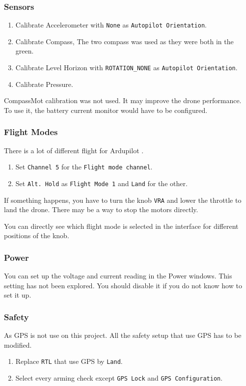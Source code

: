 \subsubsection{Sensors}
\begin{enumerate}
    \item Calibrate Accelerometer with \texttt{None} as \texttt{Autopilot Orientation}.
    \item Calibrate Compass, The two compass was used as they were both in the green.
    \item Calibrate Level Horizon  with \texttt{ROTATION\_NONE} as \texttt{Autopilot Orientation}.
    \item Calibrate Pressure.
\end{enumerate}
CompassMot calibration was not used. It may improve the drone performance. To use it, the battery current monitor would have to be configured.

\subsubsection{Flight Modes}
There is a lot of different flight for Ardupilot \cite{ardupilot_flight_modes}.
\begin{enumerate}
    \item Set \texttt{Channel 5} for the \texttt{Flight mode channel}.
    \item Set \texttt{Alt. Hold} as \texttt{Flight Mode 1} and \texttt{Land} for the other.
\end{enumerate}
If something happens, you have to turn the knob \texttt{VRA} and lower the throttle to land the drone.
There may be a way to stop the motors directly.

You can directly see which flight mode is selected in the interface for different positions of the knob.

\subsubsection{Power}
You can set up the voltage and current reading in the Power windows.
This setting has not been explored. You should disable it if you do not know how to set it up.

\subsubsection{Safety}
As GPS is not use on this project. All the safety setup that use GPS has to be modified.
\begin{enumerate}
    \item Replace \texttt{RTL} that use GPS by \texttt{Land}.
    \item Select every arming check except \texttt{GPS Lock} and \texttt{GPS Configuration}.
\end{enumerate}

